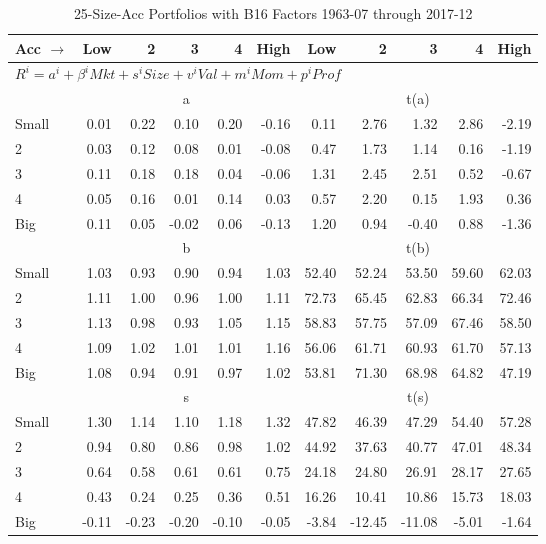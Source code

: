 
\begin{table}[!ht]
\footnotesize
\centering
\caption{25-Size-Acc Portfolios with B16 Factors 1963-07 through 2017-12}
\begin{tabular}{lrrrrrrrrrr}
  \toprule
    
    Acc $\rightarrow$ & Low & 2 & 3 & 4 & High & Low & 2 & 3 & 4 & High  \\ 
  \midrule
  \multicolumn{11}{l}{$R^i=a^i+\beta^iMkt+s^iSize+v^iVal+m^iMom+p^iProf$}  \\
  
     & \multicolumn{5}{c}{a} & \multicolumn{5}{c}{t(a)}   \\
     \cmidrule(r){2-6} \cmidrule(r){7-11} 
    Small  & 0.01  & 0.22  & 0.10  & 0.20  & -0.16  & 0.11  & 2.76  & 1.32  & 2.86  & -2.19   \\
    2  & 0.03  & 0.12  & 0.08  & 0.01  & -0.08  & 0.47  & 1.73  & 1.14  & 0.16  & -1.19   \\
    3  & 0.11  & 0.18  & 0.18  & 0.04  & -0.06  & 1.31  & 2.45  & 2.51  & 0.52  & -0.67   \\
    4  & 0.05  & 0.16  & 0.01  & 0.14  & 0.03  & 0.57  & 2.20  & 0.15  & 1.93  & 0.36   \\
    Big  & 0.11  & 0.05  & -0.02  & 0.06  & -0.13  & 1.20  & 0.94  & -0.40  & 0.88  & -1.36   \\
    
  
     & \multicolumn{5}{c}{b} & \multicolumn{5}{c}{t(b)}   \\
     \cmidrule(r){2-6} \cmidrule(r){7-11} 
    Small  & 1.03  & 0.93  & 0.90  & 0.94  & 1.03  & 52.40  & 52.24  & 53.50  & 59.60  & 62.03   \\
    2  & 1.11  & 1.00  & 0.96  & 1.00  & 1.11  & 72.73  & 65.45  & 62.83  & 66.34  & 72.46   \\
    3  & 1.13  & 0.98  & 0.93  & 1.05  & 1.15  & 58.83  & 57.75  & 57.09  & 67.46  & 58.50   \\
    4  & 1.09  & 1.02  & 1.01  & 1.01  & 1.16  & 56.06  & 61.71  & 60.93  & 61.70  & 57.13   \\
    Big  & 1.08  & 0.94  & 0.91  & 0.97  & 1.02  & 53.81  & 71.30  & 68.98  & 64.82  & 47.19   \\
    
  
     & \multicolumn{5}{c}{s} & \multicolumn{5}{c}{t(s)}   \\
     \cmidrule(r){2-6} \cmidrule(r){7-11} 
    Small  & 1.30  & 1.14  & 1.10  & 1.18  & 1.32  & 47.82  & 46.39  & 47.29  & 54.40  & 57.28   \\
    2  & 0.94  & 0.80  & 0.86  & 0.98  & 1.02  & 44.92  & 37.63  & 40.77  & 47.01  & 48.34   \\
    3  & 0.64  & 0.58  & 0.61  & 0.61  & 0.75  & 24.18  & 24.80  & 26.91  & 28.17  & 27.65   \\
    4  & 0.43  & 0.24  & 0.25  & 0.36  & 0.51  & 16.26  & 10.41  & 10.86  & 15.73  & 18.03   \\
    Big  & -0.11  & -0.23  & -0.20  & -0.10  & -0.05  & -3.84  & -12.45  & -11.08  & -5.01  & -1.64   \\
    

\end{tabular}
\end{table}
